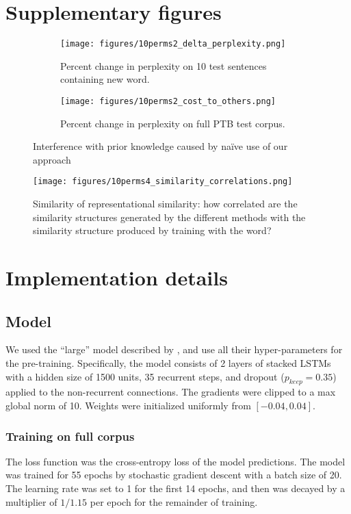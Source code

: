 \documentclass{article}
\begin{document}
\section{Supplementary figures} \label{supp_fig_appdx}

\begin{figure}[H]
\centering
\begin{subfigure}[b]{\textwidth}
\texttt{[image: figures/10perms2\_delta\_perplexity.png]}
\caption{Percent change in perplexity on 10 test sentences containing new word.}
\end{subfigure}
\begin{subfigure}[b]{\textwidth}
\texttt{[image: figures/10perms2\_cost\_to\_others.png]}
\caption{Percent change in perplexity on full PTB test corpus.}
\end{subfigure}
\caption{Interference with prior knowledge caused by na\"{i}ve use of our approach}
\label{interference_fig}
\end{figure}

\begin{figure}[H]
\centering
\texttt{[image: figures/10perms4\_similarity\_correlations.png]}
\caption{Similarity of representational similarity: how correlated are the similarity structures generated by the different methods with the similarity structure produced by training with the word?}
\label{RSA_results}
\end{figure}

\section{Implementation details} \label{methods_appdx}
\subsection{Model} \label{methods_appdx_model}
We used the ``large'' model described by \citet{Zaremba2014a}, and use all their hyper-parameters for the pre-training. Specifically, the model consists of 2 layers of stacked LSTMs with a hidden size of 1500 units, 35 recurrent steps, and dropout (\(p_{keep} = 0.35\)) applied to the non-recurrent connections. The gradients were clipped to a max global norm of 10. Weights were initialized uniformly from \([-0.04, 0.04]\). \par
\subsubsection{Training on full corpus}
The loss function was the cross-entropy loss of the model predictions. The model was trained for 55 epochs by stochastic gradient descent with a batch size of 20. The learning rate was set to 1 for the first 14 epochs, and then was decayed by a multiplier of \(1 / 1.15\) per epoch for the remainder of training. \par 
\end{document}
